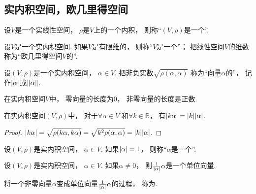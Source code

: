 \subsection{实内积空间，欧几里得空间}
\begin{definition}
设\(V\)是一个实线性空间，
\(\rho\)是\(V\)上的一个内积，
则称“\((V,\rho)\)是一个”.
\end{definition}

\begin{definition}
设\(V\)是一个实内积空间.
如果\(V\)是有限维的，
则称“\(V\)是一个”；
把线性空间\(V\)的维数称为“欧几里得空间\(V\)的”.
\end{definition}

\begin{definition}
设\((V,\rho)\)是一个实内积空间，
\(\alpha \in V\).
把非负实数\(\sqrt{\rho(\alpha,\alpha)}\)
称为“向量\(\alpha\)的”，
记作\(\abs{\alpha}\)或\(\norm{\alpha}\).
\end{definition}

\begin{property}
在实内积空间\(V\)中，
零向量的长度为\(0\)，
非零向量的长度是正数.
\end{property}

\begin{property}
在实内积空间\((V,\rho)\)中，
对于\(\forall \alpha \in V\)
和\(\forall k \in \mathbb{R}\)，
有\(\abs{k\alpha} = \abs{k} \abs{\alpha}\).
\begin{proof}
\(\abs{k\alpha}
= \sqrt{\rho(k\alpha,k\alpha)}
= \sqrt{k^2\rho(\alpha,\alpha)}
= \abs{k} \abs{\alpha}\).
\end{proof}
\end{property}

\begin{definition}
设\((V,\rho)\)是实内积空间，
\(\alpha \in V\).
如果\(\abs{\alpha} = 1\)，
则称“\(\alpha\)是一个”.
\end{definition}

\begin{property}
设\((V,\rho)\)是实内积空间，
\(\alpha \in V\).
如果\(\alpha\neq0\)，
则\(\frac1{\abs{\alpha}} \alpha\)是一个单位向量.
\end{property}
\begin{remark}
将一个非零向量\(\alpha\)变成单位向量\(\frac1{\abs{\alpha}} \alpha\)的过程，
称为.
\end{remark}

